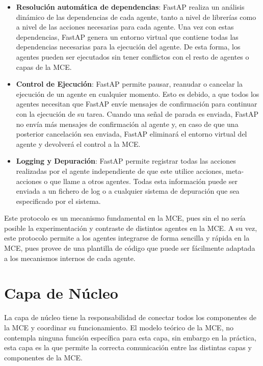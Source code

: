 \begin{itemize}

    \item \textbf{Resolución automática de dependencias}: FastAP realiza un análisis dinámico
    de las dependencias de cada agente, tanto a nivel de librerías como a nivel de las acciones
    necesarias para cada agente. Una vez con estas dependencias, FastAP genera un entorno virtual
    que contiene todas las dependencias necesarias para la ejecución del agente. De esta forma,
    los agentes pueden ser ejecutados sin tener conflictos con el resto de agentes o capas de la MCE.

    \item \textbf{Control de Ejecución}: FastAP permite pausar, reanudar o cancelar la ejecución
    de un agente en cualquier momento. Esto es debido, a que todos los agentes necesitan que FastAP
    envíe mensajes de confirmación para continuar con la ejecución de su tarea. Cuando una señal de 
    parada es enviada, FastAP no envía más mensajes de confirmación al agente y, en caso de que una posterior
    cancelación sea enviada, FastAP eliminará el entorno virtual del agente y devolverá el control a la MCE.

    \item \textbf{Logging y Depuración}: FastAP permite registrar todas las acciones realizadas por el agente
    independiente de que este utilice acciones, meta-acciones o que llame a otros agentes. Todas esta información
    puede ser enviada a un fichero de log o a cualquier sistema de depuración que sea especificado por el sistema.

\end{itemize}

Este protocolo es un mecanismo fundamental en la MCE, pues sin el no sería posible la experimentación y contraste
de distintos agentes en la MCE. A su vez, este protocolo permite a los agentes
integrarse de forma sencilla y rápida en la MCE, pues provee de una plantilla de código
que puede ser fácilmente adaptada a los mecanismos internos de cada agente.

\section{Capa de Núcleo}
La capa de núcleo tiene la responsabilidad de conectar todos los componentes
de la MCE y coordinar su funcionamiento. El modelo teórico de la MCE, no contempla
ninguna función específica para esta capa, sin embargo en la práctica, esta capa
es la que permite la correcta comunicación entre las distintas capas y componentes
de la MCE.

